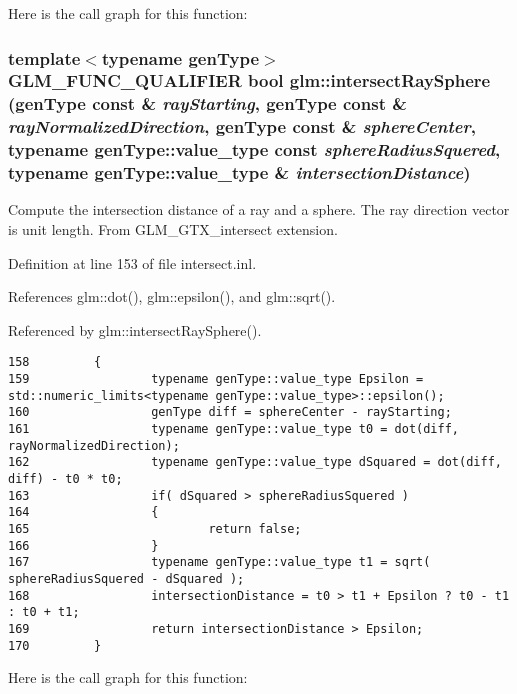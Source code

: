 Here is the call graph for this function:\hypertarget{group__gtx__intersect_g95b17f6f08015c92fc8ac3e83010492d}{
\subsubsection[intersectRaySphere]{\setlength{\rightskip}{0pt plus 5cm}template$<$typename genType$>$ GLM\_\-FUNC\_\-QUALIFIER bool glm::intersectRaySphere (genType const \& {\em rayStarting}, \/  genType const \& {\em rayNormalizedDirection}, \/  genType const \& {\em sphereCenter}, \/  typename genType::value\_\-type const {\em sphereRadiusSquered}, \/  typename genType::value\_\-type \& {\em intersectionDistance})}}
\label{group__gtx__intersect_g95b17f6f08015c92fc8ac3e83010492d}


Compute the intersection distance of a ray and a sphere. The ray direction vector is unit length. From GLM\_\-GTX\_\-intersect extension. 

Definition at line 153 of file intersect.inl.

References glm::dot(), glm::epsilon(), and glm::sqrt().

Referenced by glm::intersectRaySphere().

\begin{Code}\begin{verbatim}158         {
159                 typename genType::value_type Epsilon = std::numeric_limits<typename genType::value_type>::epsilon();
160                 genType diff = sphereCenter - rayStarting;
161                 typename genType::value_type t0 = dot(diff, rayNormalizedDirection);
162                 typename genType::value_type dSquared = dot(diff, diff) - t0 * t0;
163                 if( dSquared > sphereRadiusSquered )
164                 {
165                         return false;
166                 }
167                 typename genType::value_type t1 = sqrt( sphereRadiusSquered - dSquared );
168                 intersectionDistance = t0 > t1 + Epsilon ? t0 - t1 : t0 + t1;
169                 return intersectionDistance > Epsilon;
170         }
\end{verbatim}
\end{Code}




Here is the call graph for this function:

